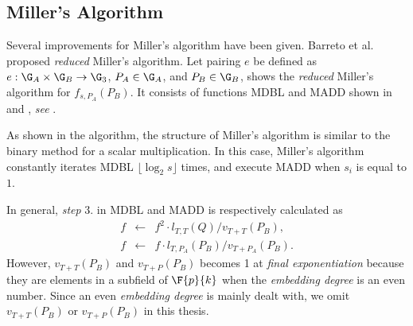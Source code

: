 \subsection{Miller's Algorithm}
Several improvements for Miller's algorithm have been given. Barreto et al. proposed {\it reduced} Miller's algorithm. 
Let pairing $e$ be defined as $e:\G_A\times\G_B\rightarrow\G_3$, $P_A\in\G_A$, and $P_B\in\G_B$,  shows the {\it reduced} Miller's algorithm for $f_{s,P_A}(P_B)$. It consists of functions MDBL and MADD shown in  
and , {\it see} .

As shown in the algorithm, the structure of Miller's algorithm is similar to the binary method for a scalar multiplication.
In this case, Miller's algorithm constantly iterates MDBL $\lfloor\log_2s\rfloor$ times, and execute MADD when $s_i$ is equal to $1$. %


In general, {\it step} 3. in MDBL and MADD is respectively calculated as  
\begin{eqnarray*}
f &\leftarrow& f^2\cdot l_{T,T}(Q)/v_{T+T}(P_B),\\
f &\leftarrow& f \cdot l_{T,P_A}(P_B)/v_{T+P_A}(P_B). 
\end{eqnarray*}
However, $v_{T+T}(P_B)$ and $v_{T+P}(P_B)$ becomes 1 at {\it final exponentiation} because they are elements in a subfield of $\F{p}{k}$ when the {\it embedding degree} is an even number.
Since an even {\it embedding degree} is mainly dealt with, we omit $v_{T+T}(P_B)$ or $v_{T+P}(P_B)$ in this thesis.


